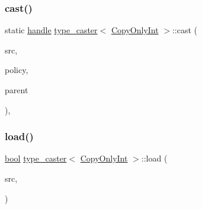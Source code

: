 \mbox{\label{structtype__caster_3_01_copy_only_int_01_4_ae7a27e2db8a50ce98db7d7bd909a7138}} 
\subsubsection{\texorpdfstring{cast()}{cast()}\hspace{0.1cm}{\footnotesize\ttfamily [2/2]}}
{\footnotesize\ttfamily static \mbox{\hyperlink{classhandle}{handle}} \mbox{\hyperlink{classtype__caster}{type\+\_\+caster}}$<$ \mbox{\hyperlink{class_copy_only_int}{Copy\+Only\+Int}} $>$\+::cast (\begin{DoxyParamCaption}\item[{const \mbox{\hyperlink{class_copy_only_int}{Copy\+Only\+Int}} $\ast$}]{src,  }\item[{\mbox{\hyperlink{detail_2common_8h_adde72ab1fb0dd4b48a5232c349a53841}{return\+\_\+value\+\_\+policy}}}]{policy,  }\item[{\mbox{\hyperlink{classhandle}{handle}}}]{parent }\end{DoxyParamCaption})\hspace{0.3cm}{\ttfamily [inline]}, {\ttfamily [static]}}

\mbox{\label{structtype__caster_3_01_copy_only_int_01_4_aa0f7e3025d45fa3c88b30559ca1a8837}} 
\subsubsection{\texorpdfstring{load()}{load()}}
{\footnotesize\ttfamily \mbox{\hyperlink{asdl_8h_af6a258d8f3ee5206d682d799316314b1}{bool}} \mbox{\hyperlink{classtype__caster}{type\+\_\+caster}}$<$ \mbox{\hyperlink{class_copy_only_int}{Copy\+Only\+Int}} $>$\+::load (\begin{DoxyParamCaption}\item[{\mbox{\hyperlink{classhandle}{handle}}}]{src,  }\item[{\mbox{\hyperlink{asdl_8h_af6a258d8f3ee5206d682d799316314b1}{bool}}}]{ }\end{DoxyParamCaption})\hspace{0.3cm}{\ttfamily [inline]}}

